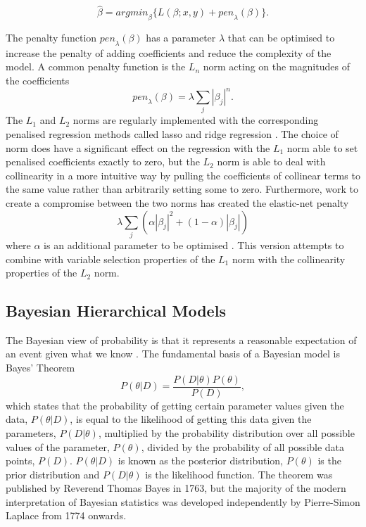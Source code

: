 \documentclass[../main.tex]{subfiles}
\begin{document}
$$ \hat{\beta} =\mathit{argmin}_{\beta} \{L(\beta;x,y) + \mathit{pen}_\lambda(\beta)\}. $$

The penalty function $\mathit{pen}_\lambda(\beta)$ has a parameter $\lambda$ that can be optimised to increase the penalty of adding coefficients and reduce the complexity of the model.
A common penalty function is the $L_n$ norm acting on the magnitudes of the coefficients
$$\mathit{pen}_\lambda(\beta) = \lambda \sum_j |\beta_j|^n.$$
The $L_1$ and $L_2$ norms are regularly implemented with the corresponding penalised regression methods called lasso and ridge regression \parencite{Tibshirani1996, Hoerl1970}. 
The choice of norm does have a significant effect on the regression with the $L_1$ norm able to set penalised coefficients exactly to zero, but the $L_2$ norm is able to deal with collinearity in a more intuitive way by pulling the coefficients of collinear terms to the same value rather than arbitrarily setting some to zero.
Furthermore, work to create a compromise between the two norms has created the elastic-net penalty 
$$\lambda \sum_j (\alpha |\beta_j|^2 + (1-\alpha)|\beta_j|)$$
where $\alpha$ is an additional parameter to be optimised \parencite{Zou2005}. 
This version attempts to combine with variable selection properties of the $L_1$ norm with the collinearity properties of the $L_2$ norm.

\subsection{Bayesian Hierarchical Models}
The Bayesian view of probability is that it represents a reasonable expectation of an event given what we know \parencite{Cox1946}.
The fundamental basis of a Bayesian model is Bayes' Theorem 
$$P(\theta|D) = \frac{P(D|\theta)P(\theta)}{P(D)},$$
which states that the probability of getting certain parameter values given the data, $P(\theta|D)$, is equal to the likelihood of getting this data given the parameters, $P(D|\theta)$, multiplied by the probability distribution over all possible values of the parameter, $P(\theta)$,  divided by the probability of all possible data points, $P(D)$.
$P(\theta|D)$ is known as the posterior distribution, $P(\theta)$ is the prior distribution and $P(D|\theta)$ is the likelihood function.
The theorem was published by Reverend Thomas Bayes in 1763, but the majority of the modern interpretation of Bayesian statistics was developed independently by Pierre-Simon Laplace from 1774 onwards.
\end{document}
